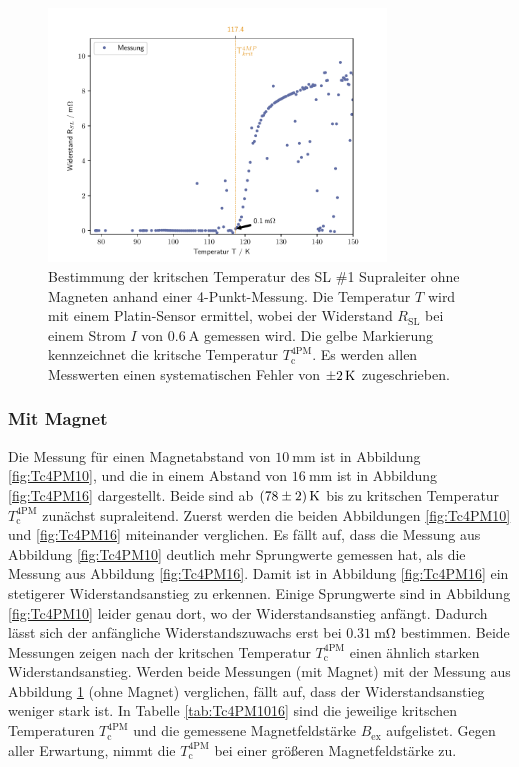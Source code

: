 \begin{figure}[H]
    \centering
    \includegraphics[width=0.8\textwidth]{Auswertung/T_krit_Pt/R_T.pdf}
    \caption{Bestimmung der kritschen Temperatur des SL \#1 Supraleiter ohne Magneten
		anhand einer 4-Punkt-Messung. Die Temperatur $T$ wird mit einem Platin-Sensor
		ermittel, wobei der Widerstand $R_{\text{SL}}$ bei einem Strom $I$ von $\SI{0.6}{\ampere}$
		gemessen wird. Die gelbe Markierung kennzeichnet die kritsche Temperatur
		$T^{\text{4PM}}_{\text{c}}$. Es werden allen Messwerten einen systematischen
		Fehler von $\SI{\pm2}{\kelvin}$	zugeschrieben.}
    \label{fig:Tc4PM}
\end{figure}

\subsubsection{Mit Magnet}
\label{sec:mitB}
Die Messung für einen Magnetabstand von $\SI{10}{\milli\meter}$ ist in Abbildung
\ref{fig:Tc4PM10}, und die in einem Abstand von $\SI{16}{\milli\meter}$ ist
in Abbildung \ref{fig:Tc4PM16} dargestellt. Beide sind ab $\SI{78\pm2}{\kelvin}$
bis zu kritschen Temperatur $T^{\text{4PM}}_{\text{c}}$ zunächst supraleitend.
Zuerst werden die beiden Abbildungen \ref{fig:Tc4PM10} und \ref{fig:Tc4PM16}
miteinander verglichen. Es fällt auf, dass die Messung aus Abbildung \ref{fig:Tc4PM10}
deutlich mehr Sprungwerte gemessen hat, als die Messung aus Abbildung \ref{fig:Tc4PM16}.
Damit ist in Abbildung \ref{fig:Tc4PM16} ein stetigerer Widerstandsanstieg zu erkennen.
Einige Sprungwerte sind in Abbildung \ref{fig:Tc4PM10} leider genau dort, wo der
Widerstandsanstieg anfängt. Dadurch lässt sich der anfängliche Widerstandszuwachs
erst bei $\SI{0.31}{\milli\ohm}$ bestimmen. Beide Messungen zeigen nach der kritschen
Temperatur $T^{\text{4PM}}_{\text{c}}$ einen ähnlich starken Widerstandsanstieg.
Werden beide Messungen (mit Magnet) mit der Messung aus Abbildung \ref{fig:Tc4PM}
(ohne Magnet) verglichen, fällt auf, dass der Widerstandsanstieg weniger stark ist.
In Tabelle \ref{tab:Tc4PM1016} sind die jeweilige kritschen Temperaturen
$T^{\text{4PM}}_{\text{c}}$ und die gemessene Magnetfeldstärke $B_{\text{ex}}$
aufgelistet. Gegen aller Erwartung, nimmt die $T^{\text{4PM}}_{\text{c}}$
bei einer größeren Magnetfeldstärke zu.


